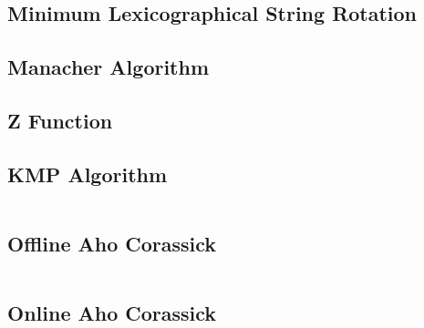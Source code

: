 \subsection{Minimum Lexicographical String Rotation}
\subsection{Manacher Algorithm}
\subsection{Z Function}
\subsection{KMP Algorithm}

\hrulefill \vspace{-\baselineskip}
\begin{multicols}{2}
\inputminted[autogobble,fontsize=\tiny]{C++}{Strings/kmp.cpp}
\end{multicols}
\vspace{-\baselineskip}
\noindent \hrulefill

\subsection{Offline Aho Corassick}

\hrulefill \vspace{-\baselineskip}
\begin{multicols}{2}
\inputminted[autogobble,fontsize=\tiny]{C++}{Strings/aho.cpp}
\end{multicols}
\vspace{-\baselineskip}
\noindent \hrulefill

\subsection{Online Aho Corassick}

\hrulefill \vspace{-\baselineskip}
\begin{multicols}{2}
\inputminted[autogobble,fontsize=\tiny]{C++}{Strings/ahotree.cpp}
\end{multicols}
\vspace{-\baselineskip}
\noindent \hrulefill
